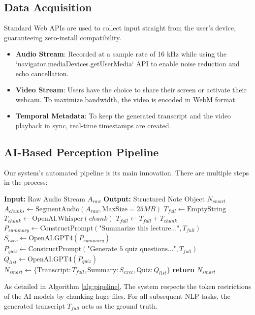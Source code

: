 \documentclass[runningheads]{llncs}
\begin{document}
\subsection{Data Acquisition}
Standard Web APIs are used to collect input straight from the user's device, guaranteeing zero-install compatibility.
\begin{itemize}
    \item \textbf{Audio Stream}: Recorded at a sample rate of 16 kHz while using the `navigator.mediaDevices.getUserMedia` API to enable noise reduction and echo cancellation.
    \item \textbf{Video Stream}: Users have the choice to share their screen or activate their webcam. To maximize bandwidth, the video is encoded in WebM format.
    \item \textbf{Temporal Metadata}: To keep the generated transcript and the video playback in sync, real-time timestamps are created.
\end{itemize}

\subsection{AI-Based Perception Pipeline}
Our system's automated pipeline is its main innovation. There are multiple steps in the process:

\begin{algorithm}
\caption{Lecture Processing Pipeline}
\label{alg:pipeline}
\begin{algorithmic}[1]
\State \textbf{Input:} Raw Audio Stream $A_{raw}$
\State \textbf{Output:} Structured Note Object $N_{smart}$
\State $A_{chunks} \gets \text{SegmentAudio}(A_{raw}, \text{MaxSize}=25MB)$
\State $T_{full} \gets \text{EmptyString}$
    \State $T_{chunk} \gets \text{OpenAI.Whisper}(chunk)$
    \State $T_{full} \gets T_{full} + T_{chunk}$
\EndFor
\State $P_{summary} \gets \text{ConstructPrompt}(\text{"Summarize this lecture..."}, T_{full})$
\State $S_{exec} \gets \text{OpenAI.GPT4}(P_{summary})$
\State $P_{quiz} \gets \text{ConstructPrompt}(\text{"Generate 5 quiz questions..."}, T_{full})$
\State $Q_{list} \gets \text{OpenAI.GPT4}(P_{quiz})$
\State $N_{smart} \gets \{ \text{Transcript}: T_{full}, \text{Summary}: S_{exec}, \text{Quiz}: Q_{list} \}$
\State \textbf{return} $N_{smart}$
\end{algorithmic}
\end{algorithm}

As detailed in Algorithm \ref{alg:pipeline}, The system respects the token restrictions of the AI models by chunking huge files. For all subsequent NLP tasks, the generated transcript $T_{full}$ acts as the ground truth.
\end{document}
